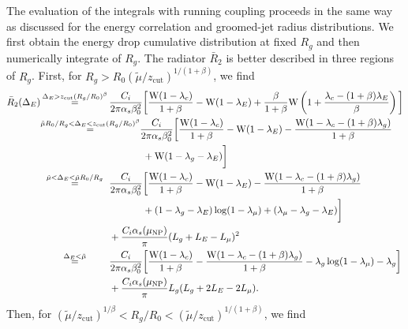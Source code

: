 \documentclass[letterpaper,11pt]{article}
\newcommand{\mut}{\tilde\mu}
\newcommand{\xlog}{{\rm W}}
\newcommand{\wideeq}[1]{\makebox[{#1}]{$=$}}
\newcommand{\as}{\alpha_s}
\newcommand{\zcut}{z_\text{cut}}
\begin{document}
The evaluation of the integrals with running coupling proceeds in the same way as discussed for the energy correlation and groomed-jet radius distributions. 
We first obtain the energy drop cumulative distribution at fixed $R_g$ and then numerically integrate of $R_g$.
The radiator $\bar{R}_2$ is better described in three regions of $R_g$. First, for $R_g >R_0 (\mut/\zcut)^{1/(1+\beta)}$, we find
\begin{align}
\bar{R}_2(\Delta_E)
 & \overset{\Delta_E > \zcut (R_g/R_0)^\beta}{\wideeq{2.5cm}} \frac{C_i}{2\pi \alpha_s \beta_0^2} \bigg[
     \frac{\xlog(1-\lambda_c)}{1+\beta}
     -\xlog(1-\lambda_E)
     +\frac{\beta}{1+\beta} \xlog\left(1+\frac{\lambda_c-(1+\beta) \lambda_E}{\beta}\right) \bigg]\\
 & \overset{\mut R_0/R_g < \Delta_E < \zcut (R_g/R_0)^\beta}{\wideeq{2.5cm}}  \frac{C_i}{2\pi \alpha_s \beta_0^2} \bigg[
     \frac{\xlog(1-\lambda_c)}{1+\beta}
     -\xlog(1-\lambda_E)
     -\frac{\xlog(1-\lambda_c-(1+\beta) \lambda_g)}{1+\beta} \notag\\
     & \phantom{\wideeq{2.5cm} \frac{C_i}{2\pi \alpha_s \beta_0^2}}
     +\xlog(1-\lambda_g-\lambda_E) \bigg]\\
 & \overset{\mut< \Delta_E < \mut R_0/R_g}{\wideeq{2.5cm}}  \frac{C_i}{2\pi \alpha_s \beta_0^2} \bigg[
     \frac{\xlog(1-\lambda_c)}{1+\beta}
     -\xlog(1-\lambda_E)
     -\frac{\xlog(1-\lambda_c-(1+\beta) \lambda_g)}{1+\beta} \notag\\
     & \phantom{\wideeq{2.5cm} \frac{C_i}{2\pi \alpha_s \beta_0^2}}
     +(1-\lambda_g-\lambda_E) \log(1-\lambda_\mu)
     + (\lambda_\mu-\lambda_g-\lambda_E) \bigg]\notag\\
     & \phantom{\wideeq{2.5cm}} + \frac{C_i\as(\mu_\text{NP})}{\pi} (L_g+L_E-L_\mu)^2\\
 & \overset{\Delta_E < \mut}{\wideeq{2.5cm}}  \frac{C_i}{2\pi \alpha_s \beta_0^2} \bigg[
     \frac{\xlog(1-\lambda_c)}{1+\beta}
     -\frac{\xlog(1-\lambda_c-(1+\beta) \lambda_g)}{1+\beta}
     -\lambda_g \log(1-\lambda_\mu)
     -\lambda_g \bigg] \notag\\
     & \phantom{\wideeq{2.5cm}} + \frac{C_i\as(\mu_\text{NP})}{\pi} L_g (L_g+2 L_E-2 L_\mu).
\end{align}
%
Then, for $(\mut/\zcut)^{1/\beta} < R_g/R_0 < (\mut/\zcut)^{1/(1+\beta)}$, we find
\end{document}
